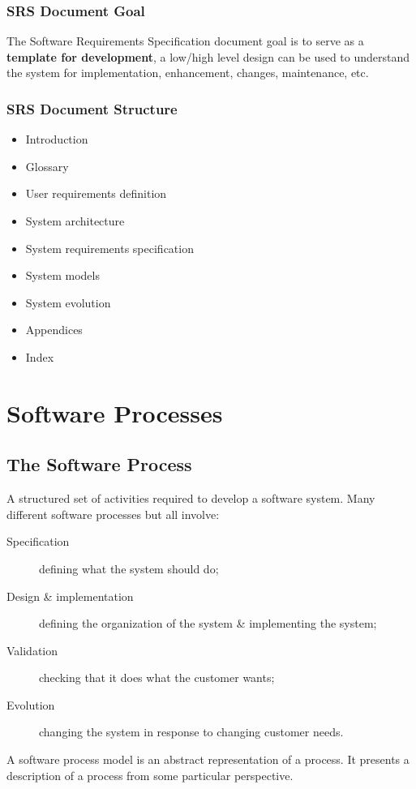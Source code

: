 \documentclass{report}
\begin{document}
\begin{multicols}{2}
\subsection{SRS Document Goal}
\noindent The Software Requirements Specification document goal is to serve as a \textbf{template for development}, a low/high level design can be used to understand the system for implementation, enhancement, changes, maintenance, etc.\newline
\vfill\columnbreak
\subsection{SRS Document Structure}
\begin{itemize}
  \item Introduction
  \item Glossary
  \item User requirements definition
  \item System architecture
  \item System requirements specification
  \item System models
  \item System evolution
  \item Appendices
  \item Index
\end{itemize}
\end{multicols}



\chapter{Software Processes}
\section{The Software Process}
A structured set of activities required to develop a software system.\newline
Many different software processes but all involve:
\begin{description}
  \item [Specification] defining what the system should do;
  \item [Design \& implementation] defining the organization of the
system \& implementing the system;
  \item [Validation] checking that it does what the customer wants;
  \item [Evolution] changing the system in response to changing
customer needs.
\end{description}
A software process model is an abstract representation of a process. It presents a description of a process from some particular perspective.
\end{document}
